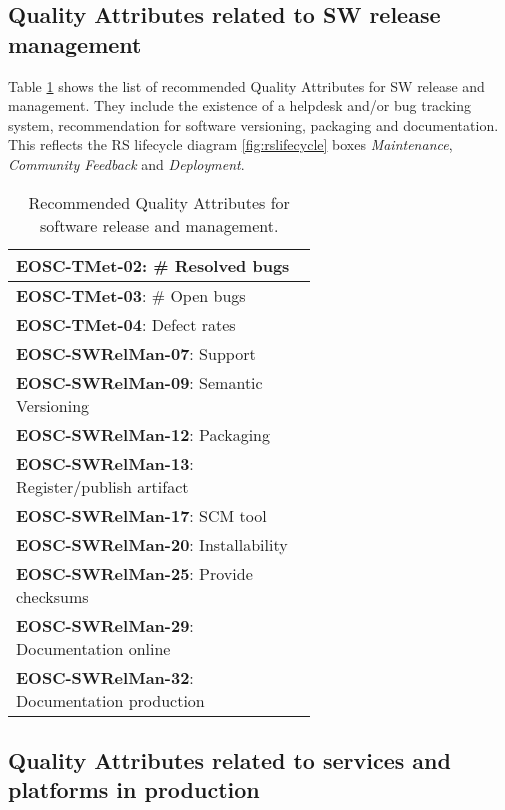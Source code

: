 \subsection{Quality Attributes related to SW release management}

Table \ref{tab:rs_rel} shows the list of recommended Quality Attributes for SW release and management. They include the existence of a helpdesk and/or bug tracking system, recommendation for software versioning, packaging and documentation. This reflects the RS lifecycle diagram \ref{fig:rslifecycle} boxes \textit{Maintenance}, \textit{Community Feedback} and \textit{Deployment}.

\begin{table}[h]
    \centering
    \scriptsize
    \begin{tabular}{|p{0.6\linewidth}|} \hline

        \textbf{EOSC-TMet-02}: \# Resolved bugs \\ \hline
        \textbf{EOSC-TMet-03}: \# Open bugs \\ \hline
        \textbf{EOSC-TMet-04}: Defect rates \\ \hline
        \textbf{EOSC-SWRelMan-07}: Support \\ \hline
        \textbf{EOSC-SWRelMan-09}: Semantic Versioning \\ \hline
        \textbf{EOSC-SWRelMan-12}: Packaging \\ \hline
        \textbf{EOSC-SWRelMan-13}: Register/publish artifact \\ \hline
        \textbf{EOSC-SWRelMan-17}: SCM tool \\ \hline
        \textbf{EOSC-SWRelMan-20}: Installability \\ \hline
        \textbf{EOSC-SWRelMan-25}: Provide checksums \\ \hline
        \textbf{EOSC-SWRelMan-29}: Documentation online \\ \hline
        \textbf{EOSC-SWRelMan-32}: Documentation production \\ \hline

    \end{tabular}
    \caption{Recommended Quality Attributes for software release and management.}
    \label{tab:rs_rel}
\end{table}

\subsection{Quality Attributes related to services and platforms in production}

